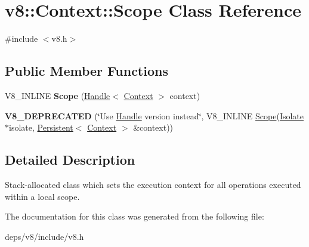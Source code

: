 \hypertarget{classv8_1_1_context_1_1_scope}{}\section{v8\+:\+:Context\+:\+:Scope Class Reference}
\label{classv8_1_1_context_1_1_scope}


{\ttfamily \#include $<$v8.\+h$>$}

\subsection*{Public Member Functions}
\begin{DoxyCompactItemize}
\item 
\hypertarget{classv8_1_1_context_1_1_scope_a171c1cb92354b52c8b1764e88b9540c8}{}V8\+\_\+\+I\+N\+L\+I\+N\+E {\bfseries Scope} (\hyperlink{classv8_1_1_handle}{Handle}$<$ \hyperlink{classv8_1_1_context}{Context} $>$ context)\label{classv8_1_1_context_1_1_scope_a171c1cb92354b52c8b1764e88b9540c8}

\item 
\hypertarget{classv8_1_1_context_1_1_scope_a07dbbde63d0b59c2a7696597a5e8b974}{}{\bfseries V8\+\_\+\+D\+E\+P\+R\+E\+C\+A\+T\+E\+D} (\char`\"{}Use \hyperlink{classv8_1_1_handle}{Handle} version instead\char`\"{}, V8\+\_\+\+I\+N\+L\+I\+N\+E \hyperlink{classv8_1_1_context_1_1_scope}{Scope}(\hyperlink{classv8_1_1_isolate}{Isolate} $\ast$isolate, \hyperlink{classv8_1_1_persistent}{Persistent}$<$ \hyperlink{classv8_1_1_context}{Context} $>$ \&context))\label{classv8_1_1_context_1_1_scope_a07dbbde63d0b59c2a7696597a5e8b974}

\end{DoxyCompactItemize}


\subsection{Detailed Description}
Stack-\/allocated class which sets the execution context for all operations executed within a local scope. 

The documentation for this class was generated from the following file\+:\begin{DoxyCompactItemize}
\item 
deps/v8/include/v8.\+h\end{DoxyCompactItemize}
